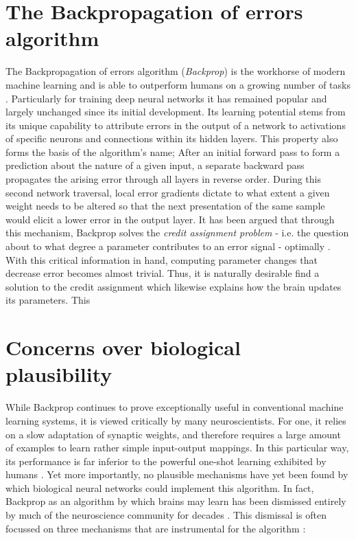 \section{The Backpropagation of errors algorithm}

The Backpropagation of errors algorithm (\textit{Backprop}) \citep{werbos1982} is the workhorse of modern machine
learning and is able to outperform humans on a growing number of tasks \citep{LeCun2015}. Particularly for training deep
neural networks it has remained popular and largely unchanged since its initial development. Its learning potential
stems from its unique capability to attribute errors in the output of a network to activations of specific neurons and
connections within its hidden layers. This property also forms the basis of the algorithm's name; After an initial
forward pass to form a prediction about the nature of a given input, a separate backward pass propagates the arising
error through all layers in reverse order. During this second network traversal, local error gradients dictate to what
extent a given weight needs to be altered so that the next presentation of the same sample would elicit a lower error in
the output layer. It has been argued that through this mechanism, Backprop solves the \textit{credit assignment problem}
- i.e. the question about to what degree a parameter contributes to an error signal - optimally \citep{Lillicrap2020}. 
With this critical information in hand, computing parameter changes that decrease error becomes almost trivial. Thus,
it is naturally desirable find a solution to the credit assignment which likewise explains how the brain updates its
parameters. This  

\section{Concerns over biological plausibility}

While Backprop continues to prove exceptionally useful in conventional machine learning systems, it is viewed critically
by many neuroscientists. For one, it relies on a slow adaptation of synaptic weights, and therefore requires a large
amount of examples to learn rather simple input-output mappings. In this particular way, its performance is far inferior
to the powerful one-shot learning exhibited by humans \citep{Brea2016}. Yet more importantly, no plausible mechanisms
have yet been found by which biological neural networks could implement this algorithm. In fact, Backprop as an
algorithm by which brains may learn has been dismissed entirely by much of the neuroscience community for decades
\citep{Grossberg1987,Crick1989,Mazzoni1991,OReilly1996}. This dismissal is often focussed on three mechanisms that are
instrumental for the algorithm \citep{whittington2019theories,Bengio2015,Liao2016}:



